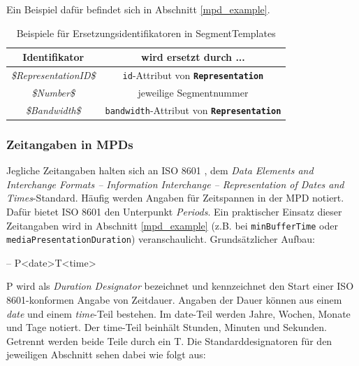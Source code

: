\documentclass[paper = a4, fontsize = 12pt, parskip = half]{scrartcl} %
\def\attr#1{\texttt{#1}}
\def\elem#1{\texttt{\textbf{#1}}}
\begin{document}
Ein Beispiel dafür befindet sich in Abschnitt \ref{mpd_example}.

\begin{center}
	\begin{table}[ht]
        \centering
		\begin{tabular}{| c | c |}
			\hline
			\textbf{Identifikator}        & \textbf{wird ersetzt durch ...}                     \\
			\hline
			\hline
			\textit{\$RepresentationID\$} & \attr{id}-Attribut von \elem{Representation}        \\
			\hline
			\textit{\$Number\$}           & jeweilige Segmentnummer                             \\
			\hline
			\textit{\$Bandwidth\$}        & \attr{bandwidth}-Attribut von \elem{Representation} \\
			\hline
		\end{tabular}
        \caption{Beispiele für Ersetzungsidentifikatoren in SegmentTemplates}
		\label{template_substitutions}
	\end{table}
\end{center}


\subsubsection{Zeitangaben in MPDs}
\label{iso8601_duration}
Jegliche Zeitangaben halten sich an ISO 8601 \cite{iso_8601}, dem \textit{Data Elements and Interchange Formats – Information Interchange – Representation of Dates and Times}-Standard. Häufig werden Angaben für Zeitspannen in der MPD notiert. Dafür bietet ISO 8601 den Unterpunkt \textit{Periods}. Ein praktischer Einsatz dieser Zeitangaben wird in Abschnitt \ref{mpd_example} (z.B. bei \attr{minBufferTime} oder \attr{mediaPresentationDuration}) veranschaulicht. Grundsätzlicher Aufbau:

-- P<date>T<time>

P wird als \textit{Duration Designator} bezeichnet und kennzeichnet den Start einer ISO 8601-konformen Angabe von Zeitdauer. Angaben der Dauer können aus einem \textit{date} und einem \textit{time}-Teil bestehen. Im date-Teil werden Jahre, Wochen, Monate und Tage notiert. Der time-Teil beinhält Stunden, Minuten und Sekunden. Getrennt werden beide Teile durch ein T. Die Standarddesignatoren für den jeweiligen Abschnitt sehen dabei wie folgt aus:
\end{document}
